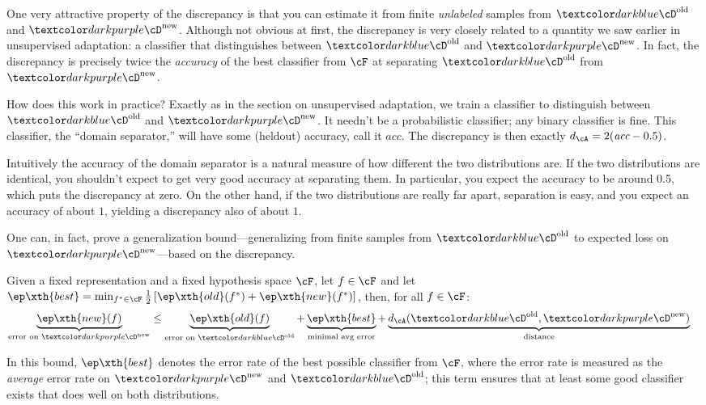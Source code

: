 One very attractive property of the discrepancy is that you can estimate it from finite \emph{unlabeled} samples from $\Dold$ and $\Dnew$.
Although not obvious at first, the discrepancy is very closely related to a quantity we saw earlier in unsupervised adaptation: a classifier that distinguishes between $\Dold$ and $\Dnew$.
In fact, the discrepancy is precisely twice the \emph{accuracy} of the best classifier from $\cF$ at separating $\Dold$ from $\Dnew$.

How does this work in practice?
Exactly as in the section on unsupervised adaptation, we train a classifier to distinguish between $\Dold$ and $\Dnew$.
It needn't be a probabilistic classifier; any binary classifier is fine.
This classifier, the ``domain separator,'' will have some (heldout) accuracy, call it $\textit{acc}$.
The discrepancy is then exactly $d_\cA = 2 (\textit{acc} - 0.5)$.

Intuitively the accuracy of the domain separator is a natural measure of how different the two distributions are.
If the two distributions are identical, you shouldn't expect to get very good accuracy at separating them.
In particular, you expect the accuracy to be around 0.5, which puts the discrepancy at zero.
On the other hand, if the two distributions are really far apart, separation is easy, and you expect an accuracy of about $1$, yielding a discrepancy also of about $1$.

One can, in fact, prove a generalization bound---generalizing from finite samples from $\Dold$ to expected loss on $\Dnew$---based on the discrepancy.
%
\begin{theorem} \label{thm:bias:adapt}
  Given a fixed representation and a fixed hypothesis space $\cF$, let $f \in \cF$ and let $\ep\xth{best} = \min_{f^* \in \cF} \frac 1 2 \left[ \ep\xth{old}(f^*) + \ep\xth{new}(f^*) \right]$, then, for all $f \in \cF$:
%
\begin{align}
  \underbrace{\ep\xth{new}(f)}_{\textrm{error on } \Dnew}
  &\leq
    \underbrace{\ep\xth{old}(f)}_{\textrm{error on } \Dold} +
    \underbrace{\ep\xth{best}}_{\textrm{minimal avg error}} +
    \underbrace{d_\cA(\Dold,\Dnew)}_{\textrm{distance}}
\end{align}
\end{theorem}
%
In this bound, $\ep\xth{best}$ denotes the error rate of the best possible classifier from $\cF$, where the error rate is measured as the \emph{average} error rate on $\Dnew$ and $\Dold$; this term ensures that at least some good classifier exists that does well on both distributions.

